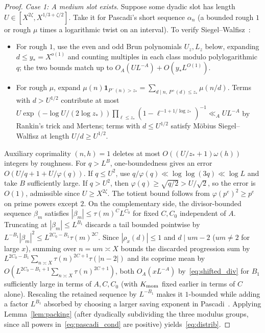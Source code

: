 \documentclass[11pt,reqno]{amsart}
\theoremstyle{remark}
\newcommand{\ind}{\mathbf{1}}
\numberwithin{equation}{section}
\begin{document}
\begin{proof}
\smallskip
\noindent\emph{Case 1: A medium slot exists.} Suppose some dyadic slot has length $U \in [X^{2\zeta}, X^{1/3+\zeta/2}]$. Take it for Pascadi's short sequence $\alpha_n$ (a bounded rough $1$ or rough $\mu$ times a logarithmic twist on an interval). To verify Siegel--Walfisz~\cite[Definition~4.3]{Pascadi2025}:
\begin{itemize}
\item For rough $1$, use the even and odd Brun polynomials $U_z, L_z$ below, expanding $d \le y_* = X^{o(1)}$ and counting multiples in each class modulo polylogarithmic $q$; the two bounds match up to $O_A(U L^{-A}) + O(y_* L^{O(1)})$.
\item For rough $\mu$, expand $\mu(n)\ind_{P^-(n)>z_*} = \sum_{d \mid n,\, P^+(d)\le z_*} \mu(n/d)$. Terms with $d > U^{1/2}$ contribute at most $U \exp(-\log U/(2\log z_*))\prod_{\ell \le z_*}(1-\ell^{-1+1/\log z_*})^{-1} \ll_A U L^{-A}$ by Rankin's trick and Mertens; terms with $d \le U^{1/2}$ satisfy Möbius Siegel--Walfisz at length $U/d \ge U^{1/2}$.
\end{itemize}
Auxiliary coprimality $(n,h)=1$ deletes at most $O((U/z_*+1)\omega(h))$ integers by roughness. For $q>L^B$, one-boundedness gives an error $O(U/q+1+U/\varphi(q))$. If $q\le U^2$, use $q/\varphi(q)\ll\log\log(3q)\ll\log L$ and take $B$ sufficiently large. If $q>U^2$, then $\varphi(q)\ge\sqrt{q/2}>U/\sqrt2$, so the error is $O(1)$, admissible since $U\ge X^{2\zeta}$. The totient bound follows from $\varphi(p^e)^2\ge p^e$ on prime powers except $2$. On the complementary side, the divisor-bounded sequence $\beta_m$ satisfies $|\beta_m|\le\tau(m)^C L^{C_0}$ for fixed $C,C_0$ independent of $A$. Truncating at $|\beta_m|\le L^{B_1}$ discards a tail bounded pointwise by $L^{-B_1}|\beta_m|^2\le L^{2C_0-B_1}\tau(m)^{2C}$. Since $|\rho_x(d)|\le1$ and $d\mid um-2$ ($um\ne2$ for large $x$), summing over $n=um\asymp X$ bounds the discarded progression sum by $L^{2C_0-B_1}\sum_{n\asymp X}\tau(n)^{2C+1}\tau(|n-2|)$ and its coprime mean by $O(L^{2C_0-B_1+1}\sum_{n\asymp X}\tau(n)^{2C+1})$, both $O_A(xL^{-A})$ by~\eqref{eq:shifted_div} for $B_1$ sufficiently large in terms of $A,C,C_0$ (with $K_{\rm mom}$ fixed earlier in terms of $C$ alone). Rescaling the retained sequence by $L^{-B_1}$ makes it $1$-bounded while adding a factor $L^{B_1}$ absorbed by choosing a larger saving exponent in Pascadi~\cite[Proposition~4.4]{Pascadi2025}. Applying Lemma~\ref{lem:packing} (after dyadically subdividing the three modulus groups, since all powers in~\eqref{eq:pascadi_cond} are positive) yields~\eqref{eq:distrib}.


\end{proof}
\end{document}
